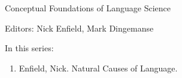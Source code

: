 {\large Conceptual Foundations of Language Science}

\bigskip

Editors: Nick Enfield, Mark Dingemanse

\bigskip

In this series:

\begin{enumerate}
\item Enfield, Nick. Natural Causes of Language.

\end{enumerate}

% 
% 


